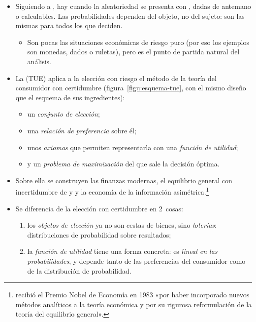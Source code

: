 \documentclass[11pt]{article}
\begin{document}
\begin{itemize}
\item Siguiendo a \textcite{Knight1921Risk}, hay  cuando la aleatoriedad se presenta con , dadas de antemano o calculables. Las probabilidades dependen del objeto, no del sujeto: son las mismas para todos los que deciden.
  \begin{itemize}
  \item Son pocas las situaciones económicas de riesgo puro (por eso los ejemplos son monedas, dados o ruletas), pero es el punto de partida natural del análisis.
  \end{itemize}
\item La  (TUE) aplica a la elección con riesgo el método de la teoría del consumidor con certidumbre  (figura~\ref{figu:esquema-tue}, con el mismo diseño que el esquema de sus ingredientes):
  \begin{itemize}
  \item un \emph{conjunto de elección};
  \item una \emph{relación de preferencia} sobre él;
  \item unos \emph{axiomas} que permiten representarla con una \emph{función de utilidad};
  \item y un \emph{problema de maximización} del que sale la decisión óptima.
  \end{itemize}
\item Sobre ella se construyen las finanzas modernas, el equilibrio general con incertidumbre de  y  y la economía de la información asimétrica.\footnote{ recibió el Premio Nobel de Economía en 1983 «por haber incorporado nuevos métodos analíticos a la teoría económica y por su rigurosa reformulación de la teoría del equilibrio general»\nocite{Nobel1983Debreu}.}
\item Se diferencia de la elección con certidumbre en 2~cosas:
  \begin{enumerate}
  \item los \emph{objetos de elección} ya no son cestas de bienes, sino \emph{loterías}: distribuciones de probabilidad sobre resultados;
  \item la \emph{función de utilidad} tiene una forma concreta: es \emph{lineal en las probabilidades}, y depende tanto de las preferencias del consumidor como de la distribución de probabilidad.
  \end{enumerate}
\end{itemize}
\end{document}

